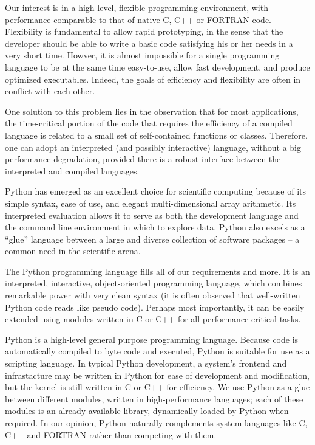 \documentclass[10pt,relax]{SANDreport}
\begin{document}
Our interest is in a high-level, flexible programming environment,
with performance comparable to that of native C, C++ or FORTRAN
code. Flexibility is fundamental to allow rapid prototyping, in the
sense that the developer should be able to write a basic code
satisfying his or her needs in a very short time.  Howver, it is
almost impossible for a single programming language to be at the same
time easy-to-use, allow fast development, and produce optimized
executables. Indeed, the goals of efficiency and flexibility are often
in conflict with each other.

One solution to this problem lies in the observation that for most
applications, the time-critical portion of the code that requires the
efficiency of a compiled language is related to a small set of
self-contained functions or classes. Therefore, one can adopt an
interpreted (and possibly interactive) language, without a big
performance degradation, provided there is a robust interface between
the interpreted and compiled languages.

Python has emerged as an excellent choice for scientific computing
because of its simple syntax, ease of use, and elegant
multi-dimensional array arithmetic. Its interpreted evaluation allows
it to serve as both the development language and the command line
environment in which to explore data. Python also excels as a ``glue''
language between a large and diverse collection of software packages
-- a common need in the scientific arena.

\smallskip

The Python programming language fills all of our requirements and
more.  It is an interpreted, interactive, object-oriented programming
language, which combines remarkable power with very clean syntax (it
is often observed that well-written Python code reads like pseudo
code).  Perhaps most importantly, it can be easily extended using
modules written in C or C++ for all performance critical tasks.

Python is a high-level general purpose programming language. Because
code is automatically compiled to byte code and executed, Python is
suitable for use as a scripting language.  In typical Python
development, a system's frontend and infrastacture may be written in
Python for ease of development and modification, but the kernel is
still written in C or C++ for efficiency.  We use Python as a glue
between different modules, written in high-performance languages; each
of these modules is an already available library, dynamically loaded
by Python when required.  In our opinion, Python naturally complements
system languages like C, C++ and FORTRAN rather than competing with
them.
\end{document}
